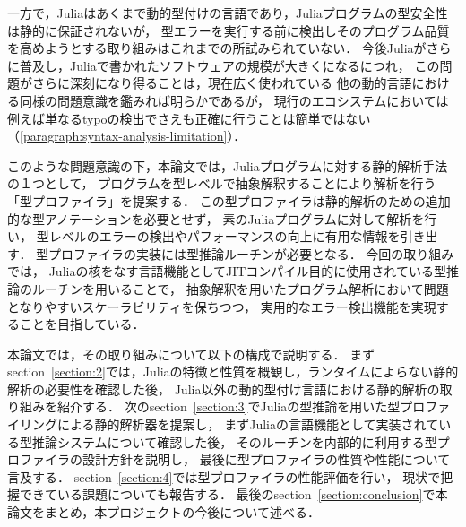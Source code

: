 一方で，Juliaはあくまで動的型付けの言語であり，Juliaプログラムの型安全性は静的に保証されないが，
型エラーを実行する前に検出しそのプログラム品質を高めようとする取り組みはこれまでの所試みられていない．
今後Juliaがさらに普及し，Juliaで書かれたソフトウェアの規模が大きくになるにつれ，
この問題がさらに深刻になり得ることは，現在広く使われている
他の動的言語における同様の問題意識を鑑みれば明らかであるが\cite{ruby-progress-report}，
現行のエコシステムにおいては例えば単なるtypoの検出でさえも正確に行うことは簡単ではない（\ref{paragraph:syntax-analysis-limitation}）．

このような問題意識の下，本論文では，Juliaプログラムに対する静的解析手法の１つとして，
プログラムを型レベルで抽象解釈することにより解析を行う「型プロファイラ」を提案する．
この型プロファイラは静的解析のための追加的な型アノテーションを必要とせず，
素のJuliaプログラムに対して解析を行い，
型レベルのエラーの検出やパフォーマンスの向上に有用な情報を引き出す．
型プロファイラの実装には型推論ルーチンが必要となる．
今回の取り組みでは，
Juliaの核をなす言語機能としてJITコンパイル目的に使用されている型推論のルーチンを用いることで，
抽象解釈を用いたプログラム解析において問題となりやすいスケーラビリティを保ちつつ，
実用的なエラー検出機能を実現することを目指している．

本論文では，その取り組みについて以下の構成で説明する．
まずsection~\ref{section:2}では，Juliaの特徴と性質を概観し，ランタイムによらない静的解析の必要性を確認した後，
Julia以外の動的型付け言語における静的解析の取り組みを紹介する．
次のsection~\ref{section:3}でJuliaの型推論を用いた型プロファイリングによる静的解析器を提案し，
まずJuliaの言語機能として実装されている型推論システムについて確認した後，
そのルーチンを内部的に利用する型プロファイラの設計方針を説明し，
最後に型プロファイラの性質や性能について言及する．
section~\ref{section:4}では型プロファイラの性能評価を行い，
現状で把握できている課題についても報告する．
最後のsection~\ref{section:conclusion}で本論文をまとめ，本プロジェクトの今後について述べる．
